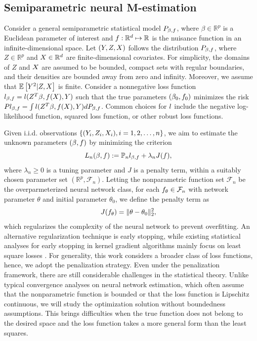 \subsection{Semiparametric neural M-estimation}\label{sec:estimat}

Consider a general semiparametric statistical model $P_{\beta, f }$, where $\beta \in \mathbb{R}^{p}$ is a Euclidean parameter of interest and $ f : \mathbb{R}^{d} \mapsto \mathbb{R}$ is the nuisance function in an infinite-dimensional space. 
Let $(Y,Z,X)$ follows the distribution $P_{\beta, f }$, where  $Z \in \mathbb{R}^{p}$ and $X \in \mathbb{R}^{d}$ are finite-dimensional covariates. 
For simplicity, the domains of $Z$ and $X$ are assumed to be bounded, compact sets with regular boundaries, and their densities are bounded away from zero and infinity. Moreover, we assume that $\mathbb{E}\left[ Y^2|Z,X \right]$ is finite. 
Consider a nonnegative loss function $l_{\beta, f} = l(Z^{T}\beta, f(X),Y)$ such that the true parameters $(\beta_{0}, f_{0})$ minimizes the risk $P l_{\beta, f} = \int l(Z^{T}\beta, f (X), Y) d P_{\beta, f }$.  
Common choices for $l$ include the negative log-likelihood function, squared loss function, or other robust loss functions. 




Given i.i.d. observations \( \{(Y_i, Z_i, X_i), i = 1, 2, \dots, n\} \), we aim to estimate the unknown parameters \( (\beta, f) \) by minimizing the criterion
\[
L_{n}(\beta, f) := \mathbb{P}_{n} l_{\beta, f} + \lambda_n J(f),
\]
where \( \lambda_n \geq 0 \) is a tuning parameter and \( J \) is a penalty term, within a suitably chosen parameter set \( (\mathbb{R}^p, \mathcal{F}_n) \). Letting the nonparametric function set \(\mathcal{F}_n\) be the overparmeterized neural network class, for each \( f_\theta \in \mathcal{F}_n \) with network parameter \( \theta \) and initial parameter \( \theta_0 \), we define the penalty term as
\[
J(f_\theta) = \|\theta - \theta_0\|_2^2,
\]
which regularizes the complexity of the neural network to prevent overfitting. 
An alternative regularization technique is early stopping, while existing statistical analyses for early stopping in kernel gradient algorithms mainly focus on least square losses \citep{yao2007early,raskutti2014early}. 
For generality, this work considers a broader class of loss functions, hence, we adopt the penalization strategy.
Even under the penalization framework, there are still considerable challenges in the statistical theory. 
Unlike typical convergence analyses on neural network estimation, which often assume that the nonparametric function is bounded or that the loss function is Lipschitz continuous, we will study the optimization solution without boundedness assumptions. This brings difficulties when the true function does not belong to the desired space and the loss function takes a more general form than the least squares.



